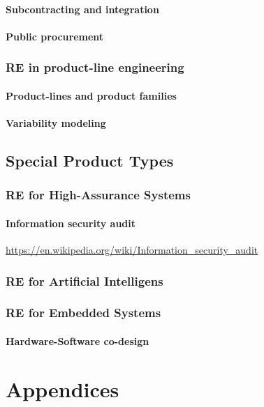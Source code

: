 \documentclass{reqengbook}
\begin{document}
\subsection{Subcontracting and integration}
\subsection{Public procurement}

\section{RE in product-line engineering}
\subsection{Product-lines and product families}
\subsection{Variability modeling}

\chapter{Special Product Types}

\section{RE for High-Assurance Systems}
\subsection{Information security audit}
\url{https://en.wikipedia.org/wiki/Information_security_audit}

\section{RE for Artificial Intelligens}

\section{RE for Embedded Systems}
\subsection{Hardware-Software co-design}

\part{Appendices}\appendix
\end{document}
